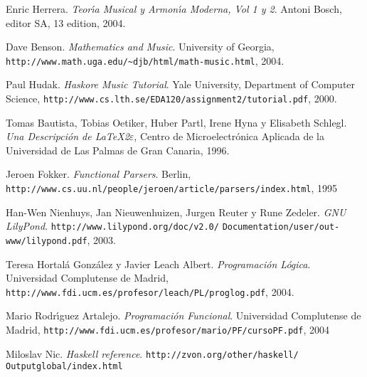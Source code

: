 \begin{thebibliography}{9}

 Enric Herrera. \textit{Teor\'\i a Musical y Armon\'\i a Moderna, Vol 1 y 2}. Antoni Bosch, editor SA, 13 edition, 2004.

 Dave Benson. \textit{Mathematics and Music}. University of Georgia, \verb+http://www.math.uga.edu/~djb/html/math-music.html+, 2004.

 Paul Hudak. \textit{Haskore Music Tutorial}. Yale University, Department of Computer Science, \verb+http://www.cs.lth.se/EDA120/assignment2/tutorial.pdf+, 2000.

 Tomas Bautista, Tobias Oetiker, Huber Partl, Irene Hyna y Elisabeth Schlegl. \textit{Una Descripci\'on de \LaTeX 2$\varepsilon$}, Centro de Microelectr\'onica Aplicada de la Universidad de Las Palmas de Gran Canaria, 1996.

 Jeroen Fokker. \textit{Functional Parsers}. Berlin, \verb+http://www.cs.uu.nl/people/jeroen/article/parsers/index.html+, 1995

 Han-Wen Nienhuys, Jan Nieuwenhuizen, Jurgen Reuter y Rune Zedeler. \textit{GNU LilyPond}. \verb+http://www.lilypond.org/doc/v2.0/+ \verb+Documentation/user/out-www/lilypond.pdf+, 2003.

 Teresa Hortal\'a Gonz\'alez y Javier Leach Albert. \textit{Programaci\'on L\'ogica}. Universidad Complutense de Madrid, \verb+http://www.fdi.ucm.es/profesor/leach/PL/proglog.pdf+, 2004.

 Mario Rodr\'\i guez Artalejo. \textit{Programaci\'on Funcional}. Universidad Complutense de Madrid, \verb+http://www.fdi.ucm.es/profesor/mario/PF/cursoPF.pdf+, 2004

 Miloslav Nic. \textit{Haskell reference}. \verb+http://zvon.org/other/haskell/+ \verb+Outputglobal/index.html+

\end{thebibliography}

